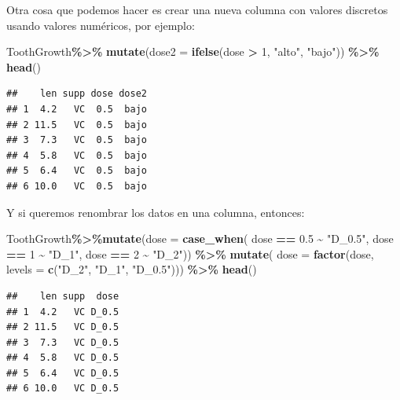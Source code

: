 \documentclass[
]{book}
\newenvironment{Shaded}{\begin{snugshade}}{\end{snugshade}}
\newcommand{\AttributeTok}[1]{\textcolor[rgb]{0.13,0.29,0.53}{#1}}
\newcommand{\DecValTok}[1]{\textcolor[rgb]{0.00,0.00,0.81}{#1}}
\newcommand{\FloatTok}[1]{\textcolor[rgb]{0.00,0.00,0.81}{#1}}
\newcommand{\FunctionTok}[1]{\textcolor[rgb]{0.13,0.29,0.53}{\textbf{#1}}}
\newcommand{\NormalTok}[1]{#1}
\newcommand{\SpecialCharTok}[1]{\textcolor[rgb]{0.81,0.36,0.00}{\textbf{#1}}}
\newcommand{\StringTok}[1]{\textcolor[rgb]{0.31,0.60,0.02}{#1}}
\begin{document}
\hfill\break
Otra cosa que podemos hacer es crear una nueva columna con valores discretos usando valores numéricos, por ejemplo:

\begin{Shaded}
\begin{Highlighting}[]
\NormalTok{ToothGrowth}\SpecialCharTok{\%\textgreater{}\%}  \FunctionTok{mutate}\NormalTok{(}\AttributeTok{dose2 =} \FunctionTok{ifelse}\NormalTok{(dose }\SpecialCharTok{\textgreater{}} \DecValTok{1}\NormalTok{, }\StringTok{"alto"}\NormalTok{, }\StringTok{"bajo"}\NormalTok{)) }\SpecialCharTok{\%\textgreater{}\%} \FunctionTok{head}\NormalTok{()}
\end{Highlighting}
\end{Shaded}

\begin{verbatim}
##    len supp dose dose2
## 1  4.2   VC  0.5  bajo
## 2 11.5   VC  0.5  bajo
## 3  7.3   VC  0.5  bajo
## 4  5.8   VC  0.5  bajo
## 5  6.4   VC  0.5  bajo
## 6 10.0   VC  0.5  bajo
\end{verbatim}

\hfill\break
Y si queremos renombrar los datos en una columna, entonces:\\

\begin{Shaded}
\begin{Highlighting}[]
\NormalTok{ToothGrowth}\SpecialCharTok{\%\textgreater{}\%}\FunctionTok{mutate}\NormalTok{(}\AttributeTok{dose =} \FunctionTok{case\_when}\NormalTok{(}
\NormalTok{    dose }\SpecialCharTok{==} \FloatTok{0.5} \SpecialCharTok{\textasciitilde{}} \StringTok{"D\_0.5"}\NormalTok{,}
\NormalTok{    dose }\SpecialCharTok{==} \DecValTok{1} \SpecialCharTok{\textasciitilde{}} \StringTok{"D\_1"}\NormalTok{,}
\NormalTok{    dose }\SpecialCharTok{==} \DecValTok{2} \SpecialCharTok{\textasciitilde{}} \StringTok{"D\_2"}\NormalTok{)) }\SpecialCharTok{\%\textgreater{}\%}  \FunctionTok{mutate}\NormalTok{(}
      \AttributeTok{dose =} \FunctionTok{factor}\NormalTok{(dose, }\AttributeTok{levels =} \FunctionTok{c}\NormalTok{(}\StringTok{"D\_2"}\NormalTok{, }\StringTok{"D\_1"}\NormalTok{, }\StringTok{"D\_0.5"}\NormalTok{))) }\SpecialCharTok{\%\textgreater{}\%} \FunctionTok{head}\NormalTok{()}
\end{Highlighting}
\end{Shaded}

\begin{verbatim}
##    len supp  dose
## 1  4.2   VC D_0.5
## 2 11.5   VC D_0.5
## 3  7.3   VC D_0.5
## 4  5.8   VC D_0.5
## 5  6.4   VC D_0.5
## 6 10.0   VC D_0.5
\end{verbatim}
\end{document}
